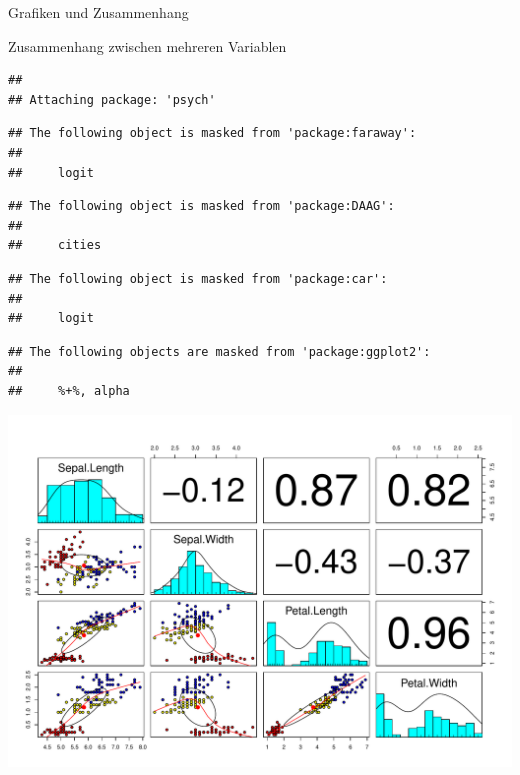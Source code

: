 \documentclass[ignorenonframetext,]{beamer}
\newenvironment{Shaded}{}{}
\newcommand{\KeywordTok}[1]{\textcolor[rgb]{0.00,0.44,0.13}{\textbf{{#1}}}}
\newcommand{\DataTypeTok}[1]{\textcolor[rgb]{0.56,0.13,0.00}{{#1}}}
\newcommand{\DecValTok}[1]{\textcolor[rgb]{0.25,0.63,0.44}{{#1}}}
\newcommand{\StringTok}[1]{\textcolor[rgb]{0.25,0.44,0.63}{{#1}}}
\newcommand{\NormalTok}[1]{{#1}}
\begin{document}
\begin{frame}[fragile]{Grafiken und Zusammenhang}
\begin{block}{Zusammenhang zwischen mehreren Variablen}
\begin{verbatim}
## 
## Attaching package: 'psych'
\end{verbatim}

\begin{verbatim}
## The following object is masked from 'package:faraway':
## 
##     logit
\end{verbatim}

\begin{verbatim}
## The following object is masked from 'package:DAAG':
## 
##     cities
\end{verbatim}

\begin{verbatim}
## The following object is masked from 'package:car':
## 
##     logit
\end{verbatim}

\begin{verbatim}
## The following objects are masked from 'package:ggplot2':
## 
##     %+%, alpha
\end{verbatim}

\begin{Shaded}
\end{Shaded}

\includegraphics{R_intern_files/figure-beamer/unnamed-chunk-206-1.pdf}


\end{block}
\end{frame}
\end{document}
